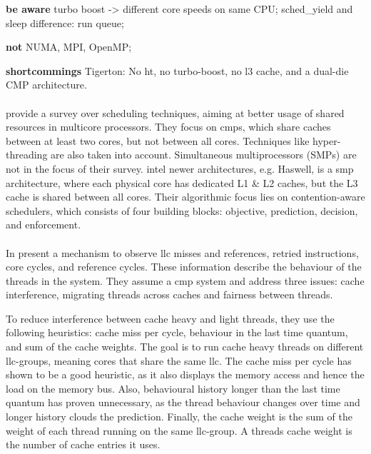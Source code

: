 \textbf{be aware} turbo boost -> different core speeds on same CPU;
sched\_yield and sleep difference: run queue;

\textbf{not} NUMA, MPI, OpenMP;

\textbf{ shortcommings } Tigerton: No \gls{ht}, no turbo-boost, no l3 cache,
and a dual-die CMP architecture.


\paragraph{ \cite{cruz_dynamic_2014} }

\paragraph{ \cite{zhuravlev_survey_2012} }
\citeauthor{zhuravlev_survey_2012} provide a survey over scheduling techniques,
aiming at better usage of shared resources in multicore processors.
They focus on \gls{cmp}s, which share caches between at
least two cores, but not between all cores.
Techniques like hyper-threading are also taken into account.
Simultaneous multiprocessors (SMPs) are not in the focus of their survey.
\gls{intel} newer architectures, e.g. Haswell, is a \gls{smp} architecture, where each
physical core has dedicated L1 \& L2 caches, but the L3 cache is shared between
all cores.
Their algorithmic focus lies on contention-aware schedulers, which consists of
four building blocks: objective, prediction, decision, and enforcement.


\paragraph{ \cite{knauerhase_using_2008} }
In  \citeauthor{knauerhase_using_2008} present
a mechanism to observe \gls{llc} misses and references, retried instructions,
core cycles, and reference cycles.
These information describe the behaviour of the threads in the system.
They assume a \gls{cmp} system and address three issues: cache interference,
migrating threads across caches and fairness between threads.

To reduce interference between cache heavy and light threads, they use the
following heuristics: cache miss per cycle, behaviour in the last time quantum,
and sum of the cache weights.
The goal is to run cache heavy threads on different \gls{llc}-groups, meaning
cores that share the same \gls{llc}.
The cache miss per cycle has shown to be a good heuristic, as it also displays
the memory access and hence the load on the memory bus.
Also, behavioural history longer than the last time quantum has proven
unnecessary, as the thread behaviour changes over time and longer history
clouds the prediction.
Finally, the cache weight is the sum of the weight of each thread running on
the same \gls{llc}-group.
A threads cache weight is the number of cache entries it uses. 

